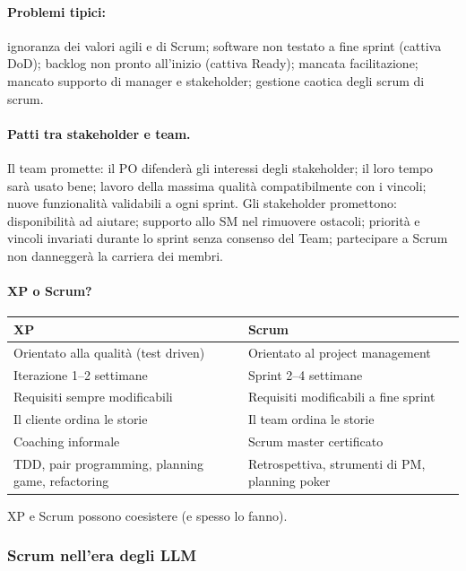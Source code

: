 \documentclass[a4paper,12pt]{article}
\begin{document}
\paragraph{Problemi tipici:} ignoranza dei valori agili e di Scrum; software non testato a
fine sprint (cattiva DoD); backlog non pronto all'inizio (cattiva Ready); mancata
facilitazione; mancato supporto di manager e stakeholder; gestione caotica degli scrum di
scrum.

\paragraph{Patti tra stakeholder e team.} Il team promette: il PO difenderà gli interessi
degli stakeholder; il loro tempo sarà usato bene; lavoro della massima qualità
compatibilmente con i vincoli; nuove funzionalità validabili a ogni sprint. Gli
stakeholder promettono: disponibilità ad aiutare; supporto allo SM nel rimuovere ostacoli;
priorità e vincoli invariati durante lo sprint senza consenso del Team; partecipare a
Scrum non danneggerà la carriera dei membri.

\paragraph{XP o Scrum?}
\begin{center}
\begin{tabular}{|p{7.2cm}|p{7.2cm}|}
\hline
\textbf{XP} & \textbf{Scrum}\\
\hline
Orientato alla qualità (test driven) & Orientato al project management\\
Iterazione 1--2 settimane & Sprint 2--4 settimane\\
Requisiti sempre modificabili & Requisiti modificabili a fine sprint\\
Il cliente ordina le storie & Il team ordina le storie\\
Coaching informale & Scrum master certificato\\
TDD, pair programming, planning game, refactoring & Retrospettiva, strumenti di PM, planning poker\\
\hline
\end{tabular}
\end{center}
XP e Scrum possono coesistere (e spesso lo fanno).


\subsubsection{Scrum nell'era degli LLM}
\end{document}
